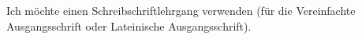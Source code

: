 Ich möchte einen Schreibschriftlehrgang verwenden (für die Vereinfachte Ausgangsschrift oder Lateinische Ausgangsschrift).